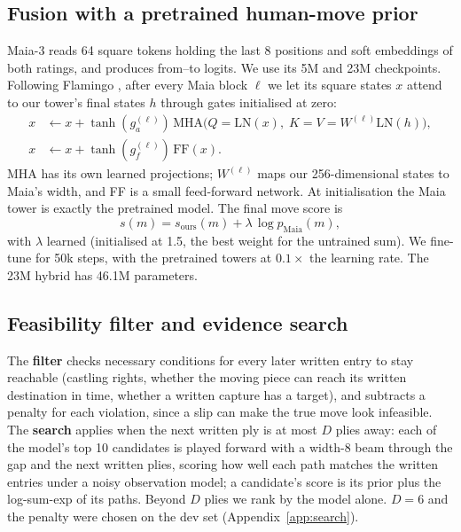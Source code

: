 \documentclass[11pt]{article}
\begin{document}
\subsection{Fusion with a pretrained human-move prior}
\label{sec:fusion}
Maia-3 \citep{maia3} reads 64 square tokens holding the last 8 positions and soft embeddings of both ratings, and produces from--to logits. We use its 5M and 23M checkpoints. Following Flamingo \citep{alayrac2022flamingo}, after every Maia block $\ell$ we let its square states $x$ attend to our tower's final states $h$ through gates initialised at zero:
\begin{align*}
x &\leftarrow x+\tanh(g_a^{(\ell)})\,\mathrm{MHA}\big(Q\!=\!\mathrm{LN}(x),\;K\!=\!V\!=\!W^{(\ell)}\mathrm{LN}(h)\big),\\
x &\leftarrow x+\tanh(g_f^{(\ell)})\,\mathrm{FF}(x).
\end{align*}
MHA has its own learned projections; $W^{(\ell)}$ maps our 256-dimensional states to Maia's width, and FF is a small feed-forward network. At initialisation the Maia tower is exactly the pretrained model. The final move score is
\[
s(m)=s_{\text{ours}}(m)+\lambda\,\log p_{\text{Maia}}(m),
\]
with $\lambda$ learned (initialised at 1.5, the best weight for the untrained sum). We fine-tune for 50k steps, with the pretrained towers at $0.1\times$ the learning rate. The 23M hybrid has 46.1M parameters.

\subsection{Feasibility filter and evidence search}
\label{sec:search}
The \textbf{filter} checks necessary conditions for every later written entry to stay reachable (castling rights, whether the moving piece can reach its written destination in time, whether a written capture has a target), and subtracts a penalty for each violation, since a slip can make the true move look infeasible.
The \textbf{search} applies when the next written ply is at most $D$ plies away: each of the model's top 10 candidates is played forward with a width-8 beam through the gap and the next written plies, scoring how well each path matches the written entries under a noisy observation model; a candidate's score is its prior plus the log-sum-exp of its paths. Beyond $D$ plies we rank by the model alone. $D=6$ and the penalty were chosen on the dev set (Appendix~\ref{app:search}).

\end{document}
